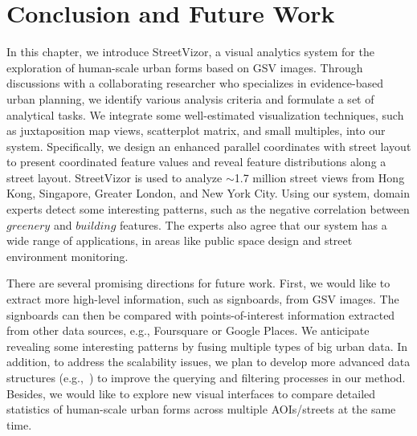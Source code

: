 \section{Conclusion and Future Work}

In this chapter, we introduce StreetVizor, a visual analytics system for the exploration of human-scale urban forms based on GSV images.
Through discussions with a collaborating researcher who specializes in evidence-based urban planning, we identify various analysis criteria and formulate a set of analytical tasks.
We integrate some well-estimated visualization techniques, such as juxtaposition map views, scatterplot matrix, and small multiples, into our system.
Specifically, we design an enhanced parallel coordinates with street layout to present coordinated feature values and reveal feature distributions along a street layout.
StreetVizor is used to analyze $\sim$1.7 million street views from Hong Kong, Singapore, Greater London, and New York City.
Using our system, domain experts detect some interesting patterns, such as the negative correlation between $greenery$ and $building$ features.
The experts also agree that our system has a wide range of applications, in areas like public space design and  street environment monitoring.

There are several promising directions for future work.
First, we would like to extract more high-level information, such as signboards, from GSV images.
The signboards can then be compared with points-of-interest information extracted from other data sources, e.g., Foursquare or Google Places.
We anticipate revealing some interesting patterns by fusing multiple types of big urban data.
In addition, to address the scalability issues, we plan to develop more advanced data structures (e.g.,~\cite{lins2013nanocubes, wang2016gaussian}) to improve the querying and filtering processes in our method.
Besides, we would like to explore new visual interfaces to compare detailed statistics of human-scale urban forms across multiple AOIs/streets at the same time.

